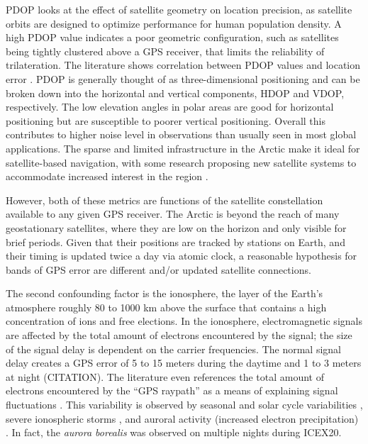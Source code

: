 PDOP looks at the effect of satellite geometry on location precision, as satellite orbits are designed to optimize performance for human population density.
A high PDOP value indicates a poor geometric configuration, such as satellites being tightly clustered above a GPS receiver, that limits the reliability of trilateration.
The literature shows correlation between PDOP values and location error \citep{swanlund_gps_2016}.
PDOP is generally thought of as three-dimensional positioning and can be broken down into the horizontal and vertical components, HDOP and VDOP, respectively.
The low elevation angles in polar areas are good for horizontal positioning but are susceptible to poorer vertical positioning.
Overall this contributes to higher noise level in observations than usually seen in most global applications.
The sparse and limited infrastructure in the Arctic make it ideal for satellite-based navigation, with some research proposing new satellite systems to accommodate increased interest in the region \citep{reid_gnss_2016}.

However, both of these metrics are functions of the satellite constellation available to any given GPS receiver.
The Arctic is beyond the reach of many geostationary satellites, where they are low on the horizon and only visible for brief periods.
Given that their positions are tracked by stations on Earth, and their timing is updated twice a day via atomic clock, a reasonable hypothesis for bands of GPS error are different and/or updated satellite connections.

The second confounding factor is the ionosphere, the layer of the Earth's atmosphere roughly 80 to 1000 km above the surface that contains a high concentration of ions and free elections. 
In the ionosphere, electromagnetic signals are affected by the total amount of electrons encountered by the signal; the size of the signal delay is dependent on the carrier frequencies.
The normal signal delay creates a GPS error of 5 to 15 meters during the daytime and 1 to 3 meters at night (CITATION).
The literature even references the total amount of electrons encountered by the ``GPS raypath'' as a means of explaining signal fluctuations \citep{themens_nature_2015}.
This variability is observed by seasonal and solar cycle variabilities \citep{themens_nature_2015}, severe ionospheric storms \citep{mitchell_gps_2005}, and auroral activity (increased electron precipitation) \citep{jin_gps_2014,gwal_gps_2011}.
In fact, the \textit{aurora borealis} was observed on multiple nights during ICEX20.

